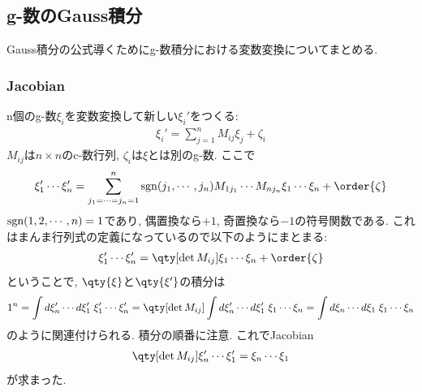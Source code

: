 \documentclass[10.5pt,a4paper]{jreport}
\begin{document}
\subsection{g-数のGauss積分}
Gauss積分の公式導くためにg-数積分における変数変換についてまとめる.
\subsubsection{Jacobian}
n個のg-数$\xi_i$を変数変換して新しい$\xi_i'$をつくる:
\begin{eqnarray}
  \xi_i' = \sum_{j=1}^nM_{ij}\xi_j + \zeta_i
\end{eqnarray}
$M_{ij}$は$n\times n$のc-数行列, $\zeta_i$は$\xi$とは別のg-数. ここで
\begin{eqnarray}
  \xi_1'\cdots\xi_n' = \sum_{j_1=\cdots =j_n = 1}^{n}{\rm sgn}(j_1, \cdots, j_n)M_{1j_1}\cdots M_{nj_n}\xi_1\cdots\xi_n + \order{\zeta}
\end{eqnarray}
${\rm sgn}(1, 2, \cdots, n) = 1$であり, 偶置換なら$+1$, 奇置換なら$-1$の符号関数である. これはまんま行列式の定義になっているので以下のようにまとまる:
\begin{eqnarray}
  \xi_1'\cdots\xi_n' = \qty[\det M_{ij}]\xi_1\cdots\xi_n + \order{\zeta}
\end{eqnarray}
ということで, $\qty{\xi}$と$\qty{\xi'}$の積分は
\begin{eqnarray}
  1^n = \int d\xi_n'\cdots d\xi_1'\; \xi_1'\cdots \xi_n' = \qty[\det M_{ij}]\int d\xi_n'\cdots d\xi_1' \;\xi_1\cdots\xi_n = \int  d\xi_n\cdots d\xi_1\; \xi_1\cdots \xi_n
\end{eqnarray}
のように関連付けられる. 積分の順番に注意. これでJacobian
\begin{eqnarray}
  \qty[\det M_{ij}]\xi_n'\cdots\xi_1' = \xi_n\cdots\xi_1
\end{eqnarray}
が求まった.
\end{document}
